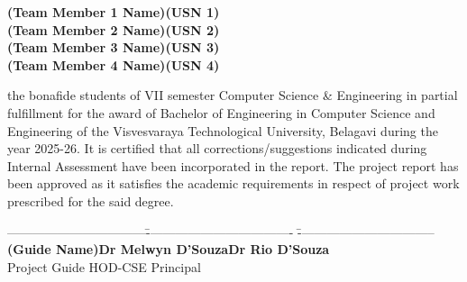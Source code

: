 \documentclass[12pt,a4paper]{report}
\begin{document}
\noindent
\vspace{2pt}
\textbf{\large \quad \quad \qquad (Team Member 1 Name)}\qquad \qquad \qquad \qquad \textbf{\large (USN 1)}\\ \vspace{2pt}
\textbf{\large \quad \quad \qquad (Team Member 2 Name)}\qquad \qquad \qquad \qquad \textbf{\large (USN 2)}\\ \vspace{2pt}
\textbf{\large \quad \quad \qquad (Team Member 3 Name)}\qquad \qquad \qquad \qquad \textbf{\large (USN 3)}\\ \vspace{2pt}
\textbf{\large \quad \quad \qquad (Team Member 4 Name)}\qquad \qquad \qquad \qquad \textbf{\large (USN 4)}\\ \vspace{1pt}
\justifying

\noindent
the bonafide students of VII semester Computer Science \& Engineering in partial fulfillment for the award of Bachelor of Engineering in Computer Science and Engineering of the Visvesvaraya Technological University, Belagavi during the year 2025-26. It is certified that all corrections/suggestions indicated during Internal Assessment have been incorporated in the report. The project report has been approved as it satisfies the academic requirements in respect of project work prescribed for the said degree.

\par
\vspace{0.33in}
\begin{tabbing}
---------------------------------\hspace{0.3in}\=----------------------------------- \hspace{0.3in}\=--------------------------------- \\
\textbf{(Guide Name)}\>\hspace{0.3in}\textbf{Dr Melwyn D'Souza}\>\hspace{0.3in}\textbf{Dr Rio D'Souza}\\
\hspace{0.5in}Project Guide\>\hspace{0.50in} HOD-CSE \>\hspace{0.6in}Principal
\end{tabbing}
\end{document}

